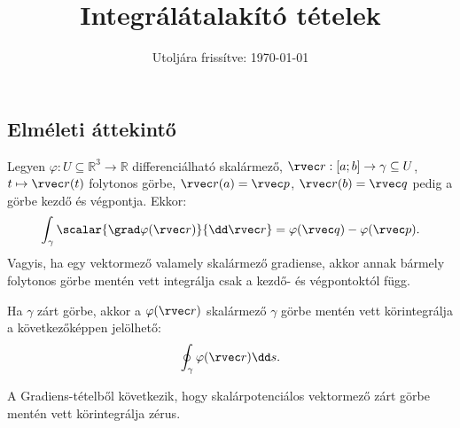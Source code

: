 \documentclass[a4paper, 12pt]{scrartcl}
\title{Integrálátalakító tételek}
\date{Utoljára frissítve: \today}
\newcommand\coordv{\rvec r}
\newcommand\arcv{\rvec r}
\begin{document}
\allowdisplaybreaks

\maketitle

\subsection{Elméleti áttekintő}

\begin{theorem}
  Legyen $\varphi : U \subseteq \mathbb R^3 \rightarrow \mathbb R$
  differenciálható skalármező, $\arcv : [a;b] \rightarrow \gamma \subseteq U$,
  $t \mapsto \arcv(t)$ folytonos görbe, $\arcv(a) = \rvec p$, $\arcv(b) =
    \rvec q$ pedig a görbe kezdő és végpontja. Ekkor:
  $$
    \int_\gamma \scalar{\grad \varphi(\coordv)}{\dd \rvec r}
    =
    \varphi(\rvec q) - \varphi(\rvec p)
    \text.
  $$
  Vagyis, ha egy vektormező valamely skalármező gradiense, akkor annak bármely
  folytonos görbe mentén vett integrálja csak a kezdő- és végpontoktól függ.
\end{theorem}

\begin{blueBox}

  Ha $\gamma$ zárt görbe, akkor a $\varphi(\rvec r)$ skalármező $\gamma$ görbe
  mentén vett körintegrálja a következőképpen jelölhető:
  $$
    \oint_\gamma \varphi(\rvec r) \dd s
    \text.
  $$
\end{blueBox}

\begin{note}
  A Gradiens-tételből következik, hogy skalárpotenciálos vektormező zárt görbe
  mentén vett körintegrálja zérus.
\end{note}
\end{document}
